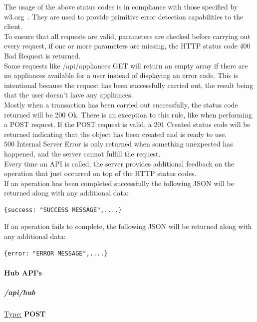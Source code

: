\documentclass[preprint,12pt,3p]{elsarticle}
\begin{document}
The usage of the above status codes is in compliance with those specified by w3.org~\cite{w3}. They are used to provide primitive error detection capabilities to the client.\\
To ensure that all requests are valid, parameters are checked before carrying out every request, if one or more parameters are missing, the HTTP status code 400 Bad Request is returned.\\
Some requests like /api/appliances GET will return an empty array if there are no appliances available for a user instead of displaying an error code. This is intentional because the request has been successfully carried out, the result being that the user doesn't have any appliances.\\
Mostly when a transaction has been carried out successfully, the status code returned will be 200 Ok. There is an exception to this rule, like when performing a POST request. If the POST request is valid, a 201 Created status code will be returned indicating that the object has been created and is ready to use.\\
500 Internal Server Error is only returned when something unexpected has happened, and the server cannot fulfill the request.\\
Every time an API is called, the server provides additional feedback on the operation that just occurred on top of the HTTP status codes.\\
If an operation has been completed successfully the following JSON will be returned along with any additional data:\\[5pt]
\begin{verbatim}
{success: "SUCCESS MESSAGE",....}
\end{verbatim}

If an operation fails to complete, the following JSON will be returned along with any additional data:\\[5pt]
\begin{verbatim}
{error: "ERROR MESSAGE",....}
\end{verbatim}


\paragraph{Hub API's}
\subparagraph*{/api/hub}
\underline{Type:} \textbf{POST}\\
\end{document}
